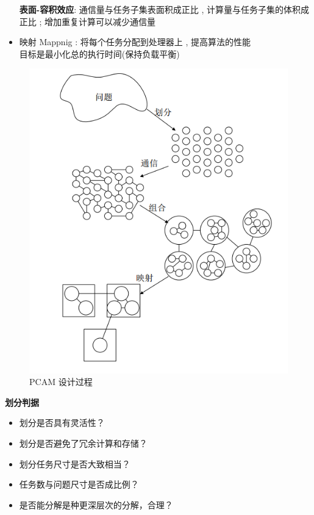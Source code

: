 \documentclass[UTF8,a4paper]{ctexart}
\begin{document}
\begin{itemize}
    \textbf{表面-容积效应}: 通信量与任务子集表面积成正比 , 计算量与任务子集的体积成正比 ; 增加重复计算可以减少通信量

    \item 映射 Mappnig : 将每个任务分配到处理器上 , 提高算法的性能\\
    目标是最小化总的执行时间(保持负载平衡)
  \end{itemize}

  \begin{figure}[H]
    \centering
    \includegraphics[scale = 0.3]{assets/ParallelComputing_af04f.png}
    \caption{PCAM 设计过程}
  \end{figure}

\textbf{划分判据}
\begin{itemize}
  \item 划分是否具有灵活性？
  \item 划分是否避免了冗余计算和存储？
  \item 划分任务尺寸是否大致相当？
  \item 任务数与问题尺寸是否成比例？
  \item 是否能分解是种更深层次的分解，合理？
\end{itemize}
\end{document}
